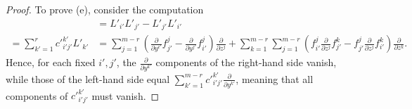 \begin{proof}
To prove (e), consider the computation
\begin{align*}
  [L'_{i'}, L'_{j'}]
  &= L'_{i'} L'_{j'} - L'_{j'} L'_{i'}
  \\
  = \sum_{k'=1}^r c'^{k'}_{i'j'} L'_{k'}
  &= \sum_{j=1}^{m-r} \left(\frac{\partial}{\partial y^{i'}} f_{j'}^j - \frac{\partial}{\partial y^{j'}} f_{i'}^j\right)\frac{\partial}{\partial z^j}
    + \sum_{k=1}^{m-r} \sum_{j=1}^{m-r} \left(f_{i'}^j \frac{\partial}{\partial z^j} f_{j'}^k - f_{j'}^j \frac{\partial}{\partial z^j} f_{i'}^k\right) \frac{\partial}{\partial z^k} .
\end{align*}
Hence, for each fixed $i',j'$, the $\frac{\partial}{\partial y^{k'}}$ components
of the right-hand side vanish, while those of the left-hand side equal
$\sum_{k'=1}^{m-r} c'^{k'}_{i'j'} \frac{\partial}{\partial y^{k'}}$, meaning
that all components of $c'^{k'}_{i'j'}$ must vanish.
\end{proof}

